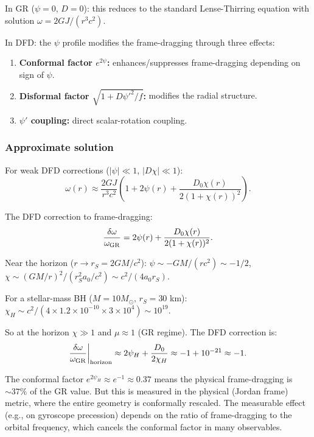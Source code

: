 \documentclass[11pt,a4paper]{article}
\begin{document}
In GR ($\psi = 0$, $D = 0$): this reduces to the standard Lense-Thirring equation with solution $\omega = 2GJ/(r^3 c^2)$.

In DFD: the $\psi$ profile modifies the frame-dragging through three effects:
\begin{enumerate}
\item \textbf{Conformal factor $e^{2\psi}$:} enhances/suppresses frame-dragging depending on sign of $\psi$.
\item \textbf{Disformal factor $\sqrt{1+D\psi'^2/f}$:} modifies the radial structure.
\item \textbf{$\psi'$ coupling:} direct scalar-rotation coupling.
\end{enumerate}

\subsubsection{Approximate solution}

For weak DFD corrections ($|\psi| \ll 1$, $|D\chi| \ll 1$):
\begin{equation}
\omega(r) \approx \frac{2GJ}{r^3 c^2}\left(1 + 2\psi(r) + \frac{D_0\chi(r)}{2(1+\chi(r))^2}\right).
\end{equation}

The DFD correction to frame-dragging:
\begin{equation}
\frac{\delta\omega}{\omega_{\rm GR}} = 2\psi(r) + \frac{D_0\chi(r)}{2(1+\chi(r))^2}.
\end{equation}

Near the horizon ($r \to r_S = 2GM/c^2$): $\psi \sim -GM/(r c^2) \sim -1/2$, $\chi \sim (GM/r)^2/(r_S^2 a_0/c^2) \sim c^2/(4a_0 r_S)$.

For a stellar-mass BH ($M = 10 M_\odot$, $r_S = 30$ km): $\chi_H \sim c^2/(4 \times 1.2\times 10^{-10} \times 3\times 10^4) \sim 10^{19}$.

So at the horizon $\chi \gg 1$ and $\mu \approx 1$ (GR regime). The DFD correction is:
\begin{equation}
\frac{\delta\omega}{\omega_{\rm GR}}\bigg|_{\rm horizon} \approx 2\psi_H + \frac{D_0}{2\chi_H} \approx -1 + 10^{-21} \approx -1.
\end{equation}

The conformal factor $e^{2\psi_H} \approx e^{-1} \approx 0.37$ means the physical frame-dragging is $\sim 37\%$ of the GR value. But this is measured in the physical (Jordan frame) metric, where the entire geometry is conformally rescaled. The measurable effect (e.g., on gyroscope precession) depends on the ratio of frame-dragging to the orbital frequency, which cancels the conformal factor in many observables.
\end{document}
